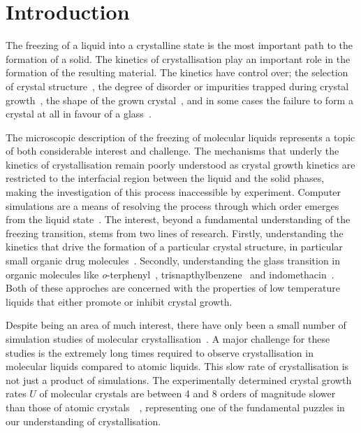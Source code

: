 \chapter {Introduction}
\label{sec:introduction}

The freezing of a liquid into a crystalline state is the most important path to the formation of a solid. The kinetics of crystallisation play an important role in the formation of the resulting material. The kinetics have control over; the selection of crystal structure~\cite{de-yoreo:03,lofton:05}, the degree of disorder or impurities trapped during crystal growth~\cite{chernov:77,malkin:99}, the shape of the grown crystal~\cite{bakar:09}, and in some cases the failure to form a crystal at all in favour of a glass~\cite{turnbull:69,uhlmann:72,debenedetti:01}.

The microscopic description of the freezing of molecular liquids represents a topic of both considerable interest and challenge. The mechanisms that underly the kinetics of crystallisation remain poorly understood as crystal growth kinetics are restricted to the interfacial region between the liquid and the solid phases, making the investigation of this process inaccessible by experiment. Computer simulations are a means of resolving the process through which order emerges from the liquid state~\cite{jackson:02,svishchev:94,tenwolde:96}. The interest, beyond a fundamental understanding of the freezing transition, stems from two lines of research. Firstly, understanding the kinetics that drive the formation of a particular crystal structure, in particular small organic drug molecules~\cite{childs:04}. Secondly, understanding the glass transition in organic molecules like \emph{o}-terphenyl~\cite{greet:67}, trisnapthylbenzene~\cite{swallen:03} and indomethacin~\cite{hancock:00}. Both of these approches are concerned with the properties of low temperature liquids that either promote or inhibit crystal growth.

Despite being an area of much interest, there have only been a small number of simulation studies of molecular crystallisation~\cite{affouard:99,kammerer:97,moreno:05}. A major challenge for these studies is the extremely long times required to observe crystallisation in molecular liquids compared to atomic liquids. This slow rate of crystallisation is not just a product of simulations. The experimentally determined crystal growth rates $U$ of molecular crystals are between 4 and 8 orders of magnitude slower than those of atomic crystals~~\cite{orava:14}, representing one of the fundamental puzzles in our understanding of crystallisation.

